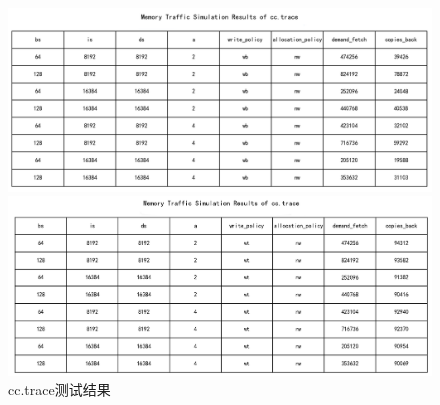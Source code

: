 \documentclass[12pt,hyperref,a4paper,UTF8]{ctexart}
\begin{document}
\begin{figure}[H]
    \centering
    \begin{minipage}[b]{0.45\textwidth}
        \centering
        \includegraphics[width=\textwidth]{./figures/fig/image35.png}
    \end{minipage}
    \hfill
    \begin{minipage}[b]{0.45\textwidth}
        \centering
        \includegraphics[width=\textwidth]{./figures/fig/image36.png}
    \end{minipage}
    \caption{cc.trace测试结果}
\end{figure}
\end{document}
